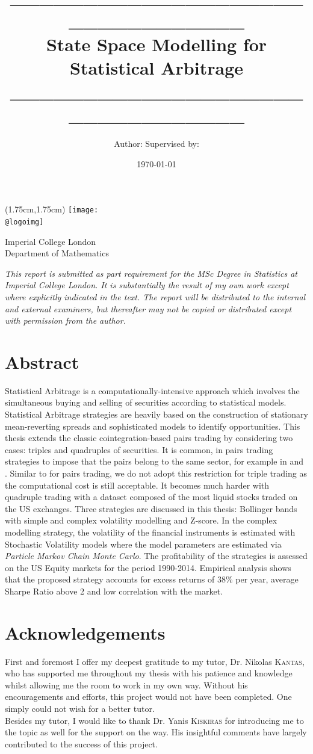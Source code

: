 \documentclass[11pt,a4,twosided,singlespacing,titlepagenumber=on]{scrreprt}
\title{\_\_\_\_\_\_\_\_\_\_\_\_\_\_\_\_\_\_\_\_\_\_\_\_\_\_\_\_\_\_\_\_ \\ State Space Modelling for Statistical Arbitrage \\ \_\_\_\_\_\_\_\_\_\_\_\_\_\_\_\_\_\_\_\_\_\_\_\_\_\_\_\_\_\_\_\_ }
\author{Author: \hfill Supervised by:}
\date{\today}
\makeatletter
\numberwithin{equation}{chapter} %
\theoremstyle{remark}
\renewcommand{\maketitle}{
\begin{titlepage}
\ifdefined\@logoimg
\begin{textblock*}{8cm}(1.75cm,1.75cm)
\texttt{[image: \\@logoimg]}
\end{textblock*}
\vspace*{1cm}

\vspace*{1cm}


\else
\fi
\begin{center}
\vspace*{\stretch{0.1}}
Imperial College London\\
Department of Mathematics\par
\vspace*{\stretch{1}} %
{\titlefont\Huge \@title\par} %
\vspace*{\stretch{2}}
{\large \textit{\@author} \par}
\vspace*{\stretch{0.1}}
{\large \@supervisor \par}
\vspace*{\stretch{3}}
\@date
\vspace*{\stretch{1}}

\end{center}%
\textit{
This report is submitted as part requirement for the MSc Degree in Statistics at Imperial College London. It is substantially the result of my own work except where explicitly indicated in the text. The report will be distributed to the internal and external examiners, but thereafter may not be copied or distributed except with permission from the author.}
\vspace*{\stretch{0.1}}
\end{titlepage}%
}
\makeatother
\begin{document}


\maketitle

\section*{Abstract}
Statistical Arbitrage is a computationally-intensive approach which involves the simultaneous buying and selling of securities according to statistical models. Statistical Arbitrage strategies are heavily based on the construction of stationary mean-reverting spreads and sophisticated models to identify opportunities. This thesis extends the classic cointegration-based pairs trading by considering two cases: triples and quadruples of securities. It is common, in pairs trading strategies to impose that the pairs belong to the same sector, for example in \cite{chan2009} and \cite{dunis2010}. Similar to \cite{caldeira2013} for pairs trading, we do not adopt this restriction for triple trading as the computational cost is still acceptable. It becomes much harder with quadruple trading with a dataset composed of the most liquid stocks traded on the US exchanges. Three strategies are discussed in this thesis: Bollinger bands with simple and complex volatility modelling and Z-score. In the complex modelling strategy, the volatility of the financial instruments is estimated with Stochastic Volatility models where the model parameters are estimated via \textit{Particle Markov Chain Monte Carlo}. The profitability of the strategies is assessed on the US Equity markets for the period 1990-2014. Empirical analysis shows that the proposed strategy accounts for excess returns of 38\% per year, average Sharpe Ratio above 2 and low correlation with the market.

\section*{Acknowledgements}
First and foremost I offer my deepest gratitude to my tutor, Dr. Nikolas \textsc{Kantas}, who has supported me throughout my thesis with his patience and knowledge whilst allowing me the room to work in my own way. Without his encouragements and efforts, this project would not have been completed. One simply could not wish for a better tutor. \\

Besides my tutor, I would like to thank Dr. Yanis \textsc{Kiskiras} for introducing me to the topic as well for the support on the way. His insightful comments have largely contributed to the success of this project. \\
\end{document}
